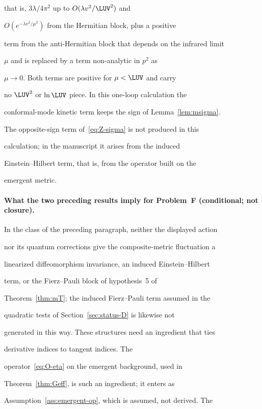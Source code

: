that is, \(3\lambda/4\pi^2\) up to \(O(\lambda v^2/\LUV^2)\) and

\(O(e^{-\lambda v^2/\mu^2})\) from the Hermitian block, plus a positive

term from the anti-Hermitian block that depends on the infrared limit

\(\mu\) and is replaced by a term non-analytic in \(p^2\) as

\(\mu\to0\). Both terms are positive for \(\mu<\LUV\) and carry

no \(\LUV^2\) or \(\ln\LUV\) piece. In this one-loop calculation the

conformal-mode kinetic term keeps the sign of Lemma~\ref{lem:msigma}.

The opposite-sign term of~\eqref{eq:Z-sigma} is not produced in this

calculation; in the manuscript it arises from the induced

Einstein--Hilbert term, that is, from the operator built on the

emergent metric.





\paragraph{What the two preceding results imply for Problem~F (conditional; not closure).} \label{detail:sec-F-paragraphwhatthetwoprecedingre-27}

In the class of the preceding paragraph, neither the displayed action

nor its quantum corrections give the composite-metric fluctuation a

linearized diffeomorphism invariance, an induced Einstein--Hilbert

term, or the Fierz--Pauli block of hypothesis~5 of

Theorem~\ref{thm:mT}; the induced Fierz--Pauli term assumed in the

quadratic tests of Section~\ref{sec:status-D} is likewise not

generated in this way. These structures need an ingredient that ties

derivative indices to tangent indices. The

operator~\eqref{eq:O-eta} on the emergent background, used in

Theorem~\ref{thm:Geff}, is such an ingredient; it enters as

Assumption~\ref{ass:emergent-op}, which is assumed, not derived. The

